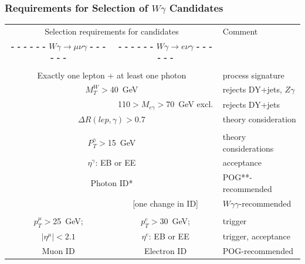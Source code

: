 \begin{frame}\frametitle{Requirements for Selection of $W\gamma$ Candidates}
  \begin{table}[h]
     \tiny
     \begin{center}
     \begin{tabular}{|c|c|l|}
     \hline
     \multicolumn{2}{|c|}{\scriptsize{Selection requirements for candidates}} & {\scriptsize{Comment}} \\ 
     {\bfseries{- - - - - - $W\gamma\rightarrow\mu\nu\gamma$ - - - - - -}} & 
     {\bfseries{- - - - - - $W\gamma\rightarrow e\nu\gamma$ - - - - - -}}  & \\ \hline

    \multicolumn{2}{|c|}{\scriptsize\bfseries\color{blue}{Event level selection criteria:}}  & \\ 
     \multicolumn{2}{|c|}{Exactly one lepton + at least one photon}  & process signature\\  
      \multicolumn{2}{|c|}{$M_T^W>$40~GeV} & rejects DY+jets, $Z\gamma$\\ 
                                & 110$>M_{e\gamma}>$70~GeV excl. & rejects DY+jets\\ 
      \multicolumn{2}{|c|}{$\Delta{R}(lep,\gamma)>$0.7} & theory consideration\\  \hline

     \multicolumn{2}{|c|}{\scriptsize\bfseries\color{blue}{Photon selection:}} & \\
     \multicolumn{2}{|c|}{\tiny{$P_T^{\gamma}>$15~GeV}} & theory considerations \\ 
     \multicolumn{2}{|c|}{\tiny{$\eta^{\gamma}$: EB or EE}} & acceptance \\ 
     \multicolumn{2}{|c|}{\tiny{Photon ID*}} & POG**-recommended \\ 
             &{\tiny{ [one change in ID]}} & $W\gamma\gamma$-recommended\\ \hline

     \multicolumn{2}{|c|}{\scriptsize\bfseries\color{blue}{Lepton selection:}} & \\
      \tiny{$p_T^{\mu}>$25~GeV;} &  \tiny{$p_T^{e}>$30~GeV;}  & trigger\\ 
      \tiny{$|\eta^{\mu}|<2.1$} & \tiny{  $\eta^{e}$: EB or EE} & trigger, acceptance\\ 
      Muon ID & Electron ID & POG-recommended \\ \hline


\end{tabular}
\end{center}
\end{table}
\end{frame}
